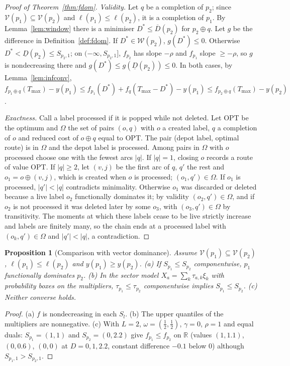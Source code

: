 \documentclass[preprint,12pt]{elsarticle}
\newtheorem{proposition}[theorem]{Proposition}
\theoremstyle{definition}
\theoremstyle{remark}
\newcommand{\R}{\mathbb{R}}
\newcommand{\Dl}{\underline{D}}
\newcommand{\Dh}{\overline{D}}
\begin{document}
\begin{proof}[Proof of Theorem~\ref{thm:fdom}]
\emph{Validity.} Let $q$ be a completion of $p_2$; since $\mathcal V(p_1)\subseteq\mathcal V(p_2)$ and $\ell(p_1)\le\ell(p_2)$, it is a completion of $p_1$. By Lemma~\ref{lem:window} there is a minimiser $D^*\le\Dh(p_2)$ for $p_2\oplus q$. Let $g$ be the difference in Definition~\ref{def:fdom}. If $D^*\in\mathcal W(p_2)$, $g(D^*)\le0$. Otherwise $D^*<\Dl(p_2)\le S_{p_2,1}$; on $(-\infty,S_{p_2,1}]$, $f_{p_2}$ has slope $-\rho$ and $f_{p_1}$ slope $\ge-\rho$, so $g$ is nondecreasing there and $g(D^*)\le g(\Dl(p_2))\le0$. In both cases, by Lemma~\ref{lem:infconv}, $f_{p_1\oplus q}(T_{\max})-y(p_1)\le f_{p_1}(D^*)+f_q(T_{\max}-D^*)-y(p_1)\le f_{p_2\oplus q}(T_{\max})-y(p_2)$.

\emph{Exactness.} Call a label processed if it is popped while not deleted. Let OPT be the optimum and $\Omega$ the set of pairs $(o,q)$ with $o$ a created label, $q$ a completion of $o$ and reduced cost of $o\oplus q$ equal to OPT. The pair (depot label, optimal route) is in $\Omega$ and the depot label is processed. Among pairs in $\Omega$ with $o$ processed choose one with the fewest arcs $|q|$. If $|q|=1$, closing $o$ records a route of value OPT. If $|q|\ge2$, let $(v,j)$ be the first arc of $q$, $q'$ the rest and $o_1=o\oplus(v,j)$, which is created when $o$ is processed; $(o_1,q')\in\Omega$. If $o_1$ is processed, $|q'|<|q|$ contradicts minimality. Otherwise $o_1$ was discarded or deleted because a live label $o_2$ functionally dominates it; by validity $(o_2,q')\in\Omega$, and if $o_2$ is not processed it was deleted later by some $o_3$, with $(o_3,q')\in\Omega$ by transitivity. The moments at which these labels cease to be live strictly increase and labels are finitely many, so the chain ends at a processed label with $(o_k,q')\in\Omega$ and $|q'|<|q|$, a contradiction.
\end{proof}

\begin{proposition}[Comparison with vector dominance]\label{prop:compare}
Assume $\mathcal V(p_1)\subseteq\mathcal V(p_2)$, $\ell(p_1)\le\ell(p_2)$ and $y(p_1)\ge y(p_2)$. (a) If $S_{p_1}\le S_{p_2}$ componentwise, $p_1$ functionally dominates $p_2$. (b) In the sector model $X_a=\sum_k\tau_{a,k}\xi_k$ with probability boxes on the multipliers, $\tau_{p_1}\le\tau_{p_2}$ componentwise implies $S_{p_1}\le S_{p_2}$. (c) Neither converse holds.
\end{proposition}
\begin{proof}
(a) $f$ is nondecreasing in each $S_l$. (b) The upper quantiles of the multipliers are nonnegative. (c) With $L=2$, $\omega=(\tfrac12,\tfrac12)$, $\gamma=0$, $\rho=1$ and equal duals: $S_{p_1}=(1,1)$ and $S_{p_2}=(0,2.2)$ give $f_{p_1}\le f_{p_2}$ on $\R$ (values $(1,1.1)$, $(0,0.6)$, $(0,0)$ at $D=0,1,2.2$, constant difference $-0.1$ below $0$) although $S_{p_1,1}>S_{p_2,1}$.
\end{proof}
\end{document}
